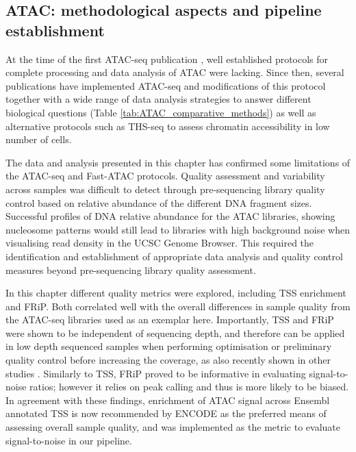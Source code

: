 \subsection{ATAC: methodological aspects and pipeline establishment}

At the time of the first ATAC-seq publication \parencite{Buenrostro2013}, well established protocols for complete processing and data analysis of ATAC were lacking. Since then, several publications have implemented ATAC-seq and modifications of this protocol together with a wide range of data analysis strategies to answer different biological questions (Table \ref{tab:ATAC_comparative_methods}) as well as alternative protocols such as THS-seq to assess chromatin accessibility in low number of cells.

The data and analysis presented in this chapter has confirmed some limitations of the ATAC-seq and Fast-ATAC protocols. Quality assessment and variability across samples was difficult to detect through pre-sequencing library quality control based on relative abundance of the different DNA fragment sizes. Successful profiles of DNA relative abundance for the ATAC libraries, showing nucleosome patterns would still lead to libraries with high background noise when visualising read density in the UCSC Genome Browser. This required the identification and establishment of appropriate data analysis and quality control measures beyond pre-sequencing library quality assessment.

In this chapter different quality metrics were explored, including TSS enrichment and FRiP. Both correlated well with the overall differences in sample quality from the ATAC-seq libraries used as an exemplar here. Importantly, TSS and FRiP were shown to be independent of sequencing depth, and therefore can be applied in low depth sequenced samples when performing optimisation or preliminary quality control before increasing the coverage, as also recently shown in other studies \parencite{Corces2017}. Similarly to TSS, FRiP proved to be informative in evaluating signal-to-noise ratios; however it relies on peak calling and thus is more likely to be biased. In agreement with these findings, enrichment of ATAC signal across Ensembl annotated TSS is now recommended by ENCODE as the preferred means of assessing overall sample quality, and was implemented as the metric to evaluate signal-to-noise in our pipeline. 

